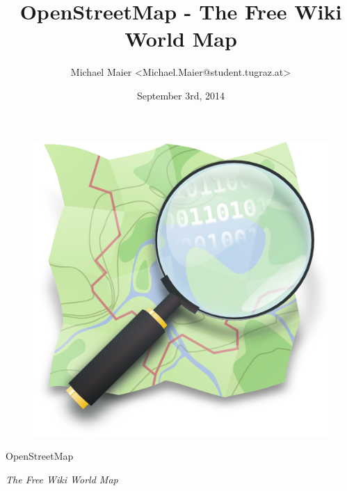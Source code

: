 \documentclass{beamer}
\title{OpenStreetMap - The Free Wiki World Map}
\author{Michael Maier \textless Michael.Maier@student.tugraz.at\textgreater}
\date{September 3rd, 2014}
\begin{document}

\begin{frame} 


\begin{figure}
  \centering
  \includegraphics[width=.5\textwidth]{mag_map.png}
\end{figure}

\begin{center}
\Huge{OpenStreetMap\\}
\end{center}

\begin{center}
\Large{\emph{The Free Wiki World Map}}
\end{center}

\end{frame}



%
\end{document}
